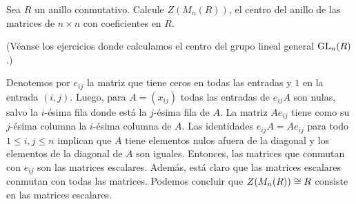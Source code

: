 \begin{ejercicio}
  Sea $R$ un anillo conmutativo. Calcule $Z (M_n (R))$, el centro del anillo
  de las matrices de $n\times n$ con coeficientes en $R$.

  \noindent (Véanse los ejercicios donde calculamos el centro del grupo lineal
  general $\operatorname{GL}_n (R)$.)

  \ifdefined\solutions
  \begin{solucion}
    Denotemos por $e_{ij}$ la matriz que tiene ceros en todas las entradas y $1$
    en la entrada $(i,j)$. Luego, para $A = (x_{ij})$ todas las entradas
    de $e_{ij} A$ son nulas, salvo la $i$-ésima fila donde está la $j$-ésima
    fila de $A$. La matriz $A e_{ij}$ tiene como su $j$-ésima columna
    la $i$-ésima columna de $A$. Las identidades $e_{ij} A = A e_{ij}$ para todo
    $1 \le i,j \le n$ implican que $A$ tiene elementos nulos afuera de
    la diagonal y los elementos de la diagonal de $A$ son iguales. Entonces,
    las matrices que conmutan con $e_{ij}$ son las matrices escalares.
    Además, está claro que las matrices escalares conmutan con todas
    las matrices. Podemos concluir que $Z (M_n (R)) \cong R$ consiste en
    las matrices escalares.
  \end{solucion}
  \fi
\end{ejercicio}

